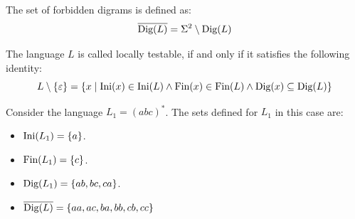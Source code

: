 \begin{definition}
    The set of forbidden digrams is defined as: 
    \[\overline{\textnormal{Dig}(L)}=\Sigma^{2} \setminus\textnormal{Dig}(L)\]
\end{definition}
\begin{definition}
    The language $L$ is called locally testable, if and only if it satisfies the following identity: 
    \[L\setminus\{\varepsilon\}=\{x\mid \textnormal{Ini}(x)\in \textnormal{Ini}(L) \land \textnormal{Fin}(x)\in \textnormal{Fin}(L)\land \textnormal{Dig}(x)\subseteq \textnormal{Dig}(L)\}\]
\end{definition}
\begin{example}
    Consider the language $L_1=(abc)^{\ast}$. 
    The sets defined for $L_1$ in this case are:
    \begin{itemize}
        \item $\textnormal{Ini}(L_1)=\{a\}$.
        \item $\textnormal{Fin}(L_1)=\{c\}$.
        \item $\textnormal{Dig}(L_1)=\{ab,bc,ca\}$.
        \item $\overline{\textnormal{Dig}(L)}=\{aa,ac,ba,bb,cb,cc\}$
    \end{itemize}
\end{example}

